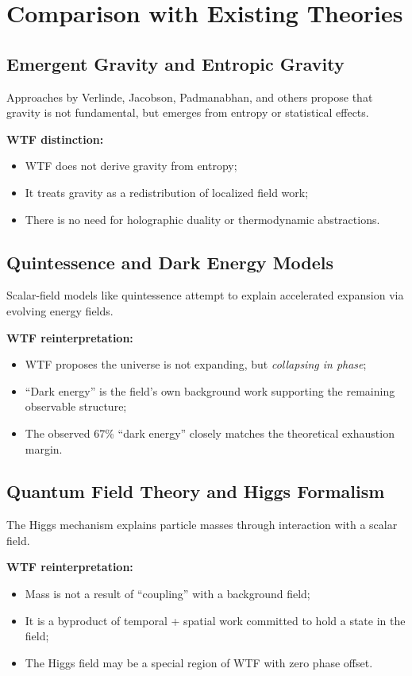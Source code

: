 \section{Comparison with Existing Theories}

\subsection{Emergent Gravity and Entropic Gravity}

Approaches by Verlinde, Jacobson, Padmanabhan, and others propose that gravity is not fundamental, but emerges from entropy or statistical effects.

\textbf{WTF distinction:}
\begin{itemize}
    \item WTF does not derive gravity from entropy;
    \item It treats gravity as a redistribution of localized field work;
    \item There is no need for holographic duality or thermodynamic abstractions.
\end{itemize}

\subsection{Quintessence and Dark Energy Models}

Scalar-field models like quintessence attempt to explain accelerated expansion via evolving energy fields.

\textbf{WTF reinterpretation:}
\begin{itemize}
    \item WTF proposes the universe is not expanding, but \textit{collapsing in phase};
    \item “Dark energy” is the field’s own background work supporting the remaining observable structure;
    \item The observed 67\% “dark energy” closely matches the theoretical exhaustion margin.
\end{itemize}

\subsection{Quantum Field Theory and Higgs Formalism}

The Higgs mechanism explains particle masses through interaction with a scalar field.

\textbf{WTF reinterpretation:}
\begin{itemize}
    \item Mass is not a result of “coupling” with a background field;
    \item It is a byproduct of temporal + spatial work committed to hold a state in the field;
    \item The Higgs field may be a special region of WTF with zero phase offset.
\end{itemize}

